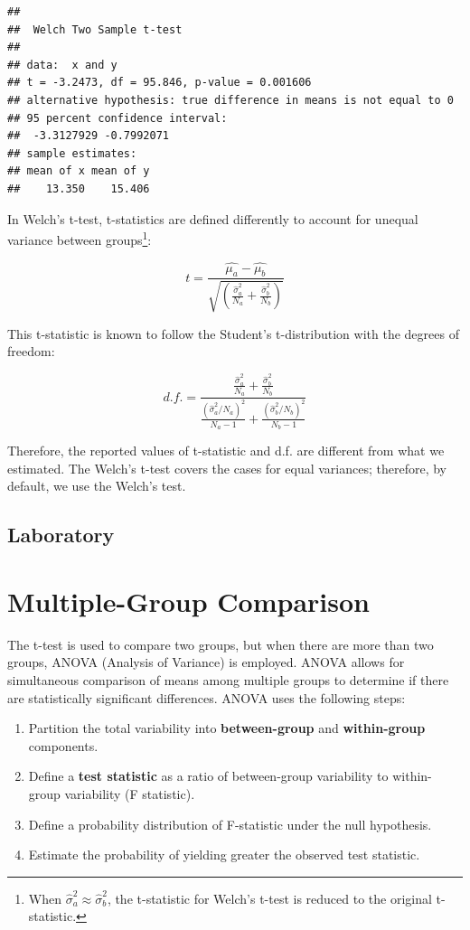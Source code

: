 \documentclass[
]{article}
\providecommand{\tightlist}{%
  \setlength{\itemsep}{0pt}\setlength{\parskip}{0pt}}
\begin{document}
\begin{verbatim}
## 
##  Welch Two Sample t-test
## 
## data:  x and y
## t = -3.2473, df = 95.846, p-value = 0.001606
## alternative hypothesis: true difference in means is not equal to 0
## 95 percent confidence interval:
##  -3.3127929 -0.7992071
## sample estimates:
## mean of x mean of y 
##    13.350    15.406
\end{verbatim}

In Welch's t-test, t-statistics are defined differently to account for unequal variance between groups\footnote{When \(\hat{\sigma}^2_a \approx \hat{\sigma}_b^2\), the t-statistic for Welch's t-test is reduced to the original t-statistic.}:

\[
t = \frac{\hat{\mu_a} - \hat{\mu_b}}{\sqrt{\left(\frac{\hat{\sigma}^2_a}{N_a} + \frac{\hat{\sigma}^2_b}{N_b}\right)}}
\]

This t-statistic is known to follow the Student's t-distribution with the degrees of freedom:

\[
d.f. = \frac{\frac{\hat{\sigma}^2_a}{N_a} + \frac{\hat{\sigma}^2_b}{N_b}}{\frac{(\hat{\sigma}^2_a / N_a)^2}{N_a - 1} + \frac{(\hat{\sigma}^2_b/N_b)^2}{N_b-1}}
\]

Therefore, the reported values of t-statistic and d.f. are different from what we estimated. The Welch's t-test covers the cases for equal variances; therefore, by default, we use the Welch's test.

\hypertarget{laboratory-3}{%
\subsection{Laboratory}\label{laboratory-3}}

\hypertarget{multiple-group-comparison}{%
\section{Multiple-Group Comparison}\label{multiple-group-comparison}}

The t-test is used to compare two groups, but when there are more than two groups, ANOVA (Analysis of Variance) is employed. ANOVA allows for simultaneous comparison of means among multiple groups to determine if there are statistically significant differences. ANOVA uses the following steps:

\begin{enumerate}
\def\labelenumi{\arabic{enumi}.}
\tightlist
\item
  Partition the total variability into \textbf{between-group} and \textbf{within-group} components.
\item
  Define a \textbf{test statistic} as a ratio of between-group variability to within-group variability (F statistic).
\item
  Define a probability distribution of F-statistic under the null hypothesis.
\item
  Estimate the probability of yielding greater the observed test statistic.
\end{enumerate}
\end{document}

